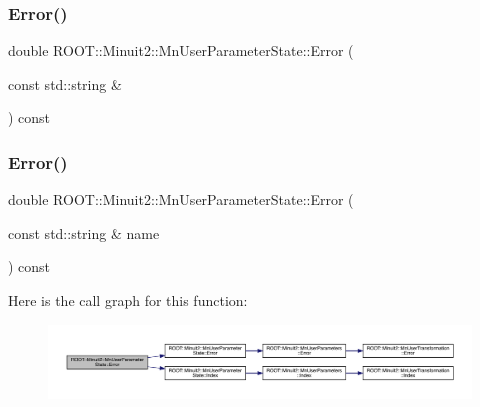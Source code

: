\subsubsection{\texorpdfstring{Error()}{Error()}\hspace{0.1cm}{\footnotesize\ttfamily [4/6]}}
{\footnotesize\ttfamily double R\+O\+O\+T\+::\+Minuit2\+::\+Mn\+User\+Parameter\+State\+::\+Error (\begin{DoxyParamCaption}\item[{const std\+::string \&}]{ }\end{DoxyParamCaption}) const}

\mbox{\label{classROOT_1_1Minuit2_1_1MnUserParameterState_a74ae393362454df2808936090391560f}} 
\subsubsection{\texorpdfstring{Error()}{Error()}\hspace{0.1cm}{\footnotesize\ttfamily [5/6]}}
{\footnotesize\ttfamily double R\+O\+O\+T\+::\+Minuit2\+::\+Mn\+User\+Parameter\+State\+::\+Error (\begin{DoxyParamCaption}\item[{const std\+::string \&}]{name }\end{DoxyParamCaption}) const}

Here is the call graph for this function\+:
\nopagebreak
\begin{figure}[H]
\begin{center}
\leavevmode
\includegraphics[width=350pt]{d3/de0/classROOT_1_1Minuit2_1_1MnUserParameterState_a74ae393362454df2808936090391560f_cgraph}
\end{center}
\end{figure}
\mbox{\label{classROOT_1_1Minuit2_1_1MnUserParameterState_a74ae393362454df2808936090391560f}} 
